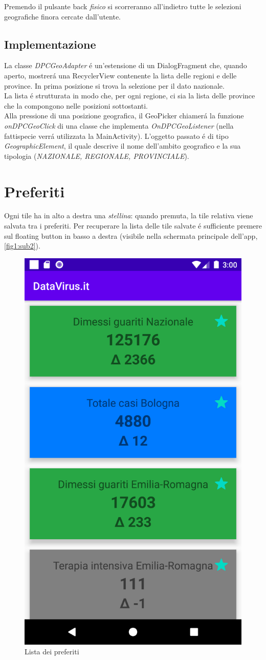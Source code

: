 \documentclass{article}
\begin{document}
    Premendo il pulsante back \emph{fisico} si scorreranno all'indietro tutte le selezioni geografiche finora cercate dall'utente.

    \subsection{Implementazione}

    La classe \emph{DPCGeoAdapter} é un'estensione di un DialogFragment che, quando aperto, mostrerá una RecyclerView contenente la lista delle regioni e delle province. In prima posizione si trova la selezione per il dato nazionale.
    \\
    La lista é strutturata in modo che, per ogni regione, ci sia la lista delle province che la compongono nelle posizioni sottostanti. 
    \\
    Alla pressione di una posizione geografica, il GeoPicker chiamerá la funzione \emph{onDPCGeoClick} di una classe che implementa \emph{OnDPCGeoListener} (nella fattispecie verrá utilizzata la MainActivity).
    L'oggetto passato é di tipo \emph{GeographicElement}, il quale descrive il nome dell'ambito geografico e la sua tipologia (\emph{NAZIONALE, REGIONALE, PROVINCIALE}).

    \section{Preferiti}
    Ogni tile ha in alto a destra una \emph{stellina}: quando premuta, la tile relativa viene salvata tra i preferiti.
    Per recuperare la lista delle tile salvate é sufficiente premere sul floating button in basso a destra (visibile nella schermata principale dell'app, \ref{fig1:sub2}).

    \begin{figure}[h]
        \centering
        \includegraphics[width=.5\linewidth]{preferences.png}
        \caption{Lista dei preferiti}
        \label{fig4}
    \end{figure}
\end{document}
